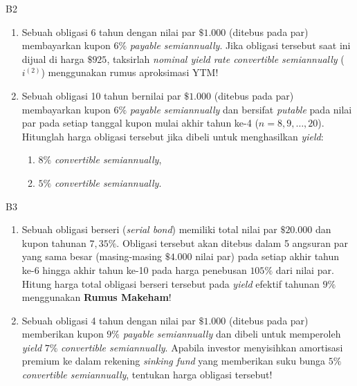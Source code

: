 \documentclass[11pt,a4paper]{article}
\begin{document}
\begin{naskahsoalbox}{B2}
\begin{enumerate}[label=(\alph*), leftmargin=6mm, topsep=1pt, itemsep=2pt]
    \item Sebuah obligasi 6 tahun dengan nilai par $\$1.000$ (ditebus pada par) membayarkan kupon $6\%$ \textit{payable semiannually}. Jika obligasi tersebut saat ini dijual di harga $\$925$, taksirlah \textit{nominal yield rate convertible semiannually} ($i^{(2)}$) menggunakan rumus aproksimasi YTM!
    \item Sebuah obligasi 10 tahun bernilai par $\$1.000$ (ditebus pada par) membayarkan kupon $6\%$ \textit{payable semiannually} dan bersifat \textit{putable} pada nilai par pada setiap tanggal kupon mulai akhir tahun ke-4 ($n = 8, 9, \dots, 20$). Hitunglah harga obligasi tersebut jika dibeli untuk menghasilkan \textit{yield}:
    \begin{enumerate}[label=(\roman*), leftmargin=6mm, topsep=1pt, itemsep=1pt]
        \item $8\%$ \textit{convertible semiannually},
        \item $5\%$ \textit{convertible semiannually}.
    \end{enumerate}
\end{enumerate}
\end{naskahsoalbox}

\begin{naskahsoalbox}{B3}
\begin{enumerate}[label=(\alph*), leftmargin=6mm, topsep=1pt, itemsep=2pt]
    \item Sebuah obligasi berseri (\textit{serial bond}) memiliki total nilai par $\$20.000$ dan kupon tahunan $7{,}35\%$. Obligasi tersebut akan ditebus dalam 5 angsuran par yang sama besar (masing-masing $\$4.000$ nilai par) pada setiap akhir tahun ke-6 hingga akhir tahun ke-10 pada harga penebusan $105\%$ dari nilai par. Hitung harga total obligasi berseri tersebut pada \textit{yield} efektif tahunan $9\%$ menggunakan \textbf{Rumus Makeham}!
    \item Sebuah obligasi 4 tahun dengan nilai par $\$1.000$ (ditebus pada par) memberikan kupon $9\%$ \textit{payable semiannually} dan dibeli untuk memperoleh \textit{yield} $7\%$ \textit{convertible semiannually}. Apabila investor menyisihkan amortisasi premium ke dalam rekening \textit{sinking fund} yang memberikan suku bunga $5\%$ \textit{convertible semiannually}, tentukan harga obligasi tersebut!
\end{enumerate}
\end{naskahsoalbox}
\end{document}
